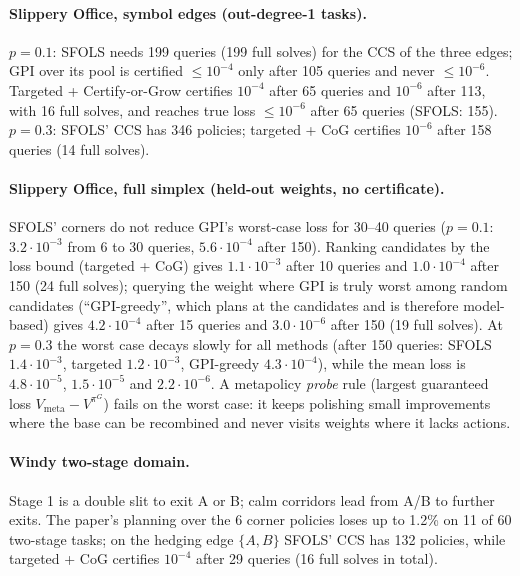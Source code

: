 \documentclass[11pt]{article}
\begin{document}
\paragraph{Slippery Office, symbol edges (out-degree-1 tasks).}
$p=0.1$: SFOLS needs 199 queries (199 full solves) for the CCS of the three edges; GPI over its pool is certified
$\le10^{-4}$ only after 105 queries and never $\le10^{-6}$. Targeted + Certify-or-Grow certifies $10^{-4}$ after 65
queries and $10^{-6}$ after 113, with 16 full solves, and reaches true loss $\le10^{-6}$ after 65 queries (SFOLS:
155). $p=0.3$: SFOLS' CCS has 346 policies; targeted + CoG certifies $10^{-6}$ after 158 queries (14 full solves).

\paragraph{Slippery Office, full simplex (held-out weights, no certificate).}
SFOLS' corners do not reduce GPI's worst-case loss for 30--40 queries ($p=0.1$: $3.2\cdot10^{-3}$ from 6 to 30
queries, $5.6\cdot10^{-4}$ after 150). Ranking candidates by the loss bound (targeted + CoG) gives $1.1\cdot10^{-3}$
after 10 queries and $1.0\cdot10^{-4}$ after 150 (24 full solves); querying the weight where GPI is truly worst
among random candidates (``GPI-greedy'', which plans at the candidates and is therefore model-based) gives
$4.2\cdot10^{-4}$ after 15 queries and $3.0\cdot10^{-6}$ after 150 (19 full solves). At $p=0.3$ the worst case decays
slowly for all methods (after 150 queries: SFOLS $1.4\cdot10^{-3}$, targeted $1.2\cdot10^{-3}$, GPI-greedy
$4.3\cdot10^{-4}$), while the mean loss is $4.8\cdot10^{-5}$, $1.5\cdot10^{-5}$ and $2.2\cdot10^{-6}$. A metapolicy
\emph{probe} rule (largest guaranteed loss $V_{\mathrm{meta}}-V^{\pi^G}$) fails on the worst case: it keeps
polishing small improvements where the base can be recombined and never visits weights where it lacks actions.

\paragraph{Windy two-stage domain.} Stage 1 is a double slit to exit A or B; calm corridors lead from A/B to
further exits. The paper's planning over the 6 corner policies loses up to 1.2\% on 11 of 60 two-stage tasks;
on the hedging edge $\{A,B\}$ SFOLS' CCS has 132 policies, while targeted + CoG certifies $10^{-4}$ after 29 queries
(16 full solves in total).
\end{document}
